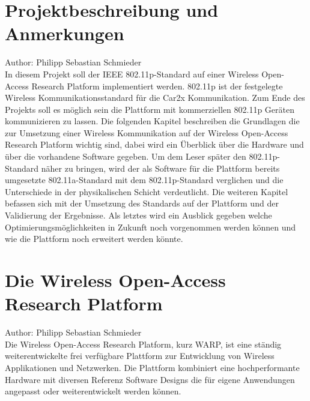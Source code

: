 \documentclass[letterpaper,11pt]{article}
\begin{document}
\thispagestyle{empty}
\newpage
\tableofcontents
\thispagestyle{empty}
\newpage
\setcounter{page}{1}
\begin{onehalfspace}
\section{Projektbeschreibung und Anmerkungen}
\small Author: Philipp Sebastian Schmieder\\
\Large
In diesem Projekt soll der IEEE 802.11p-Standard auf einer Wireless Open-Access Research Platform implementiert werden. 802.11p ist der festgelegte Wireless Kommunikationsstandard für die Car2x Kommunikation. Zum Ende des Projekts soll es möglich sein die Plattform mit kommerziellen 802.11p Geräten kommunizieren zu lassen. Die folgenden Kapitel beschreiben die Grundlagen die zur Umsetzung einer Wireless Kommunikation auf der Wireless Open-Access Research Platform wichtig sind, dabei wird ein Überblick über die Hardware und über die vorhandene Software gegeben. Um dem Leser später den 802.11p-Standard näher zu bringen, wird der als Software für die Plattform bereits umgesetzte 802.11a-Standard mit dem 802.11p-Standard verglichen und die Unterschiede in der physikalischen Schicht verdeutlicht. Die weiteren Kapitel befassen sich mit der Umsetzung des Standards auf der Plattform und der Validierung der Ergebnisse. Als letztes wird ein Ausblick gegeben welche Optimierungsmöglichkeiten in Zukunft noch vorgenommen werden können und wie die Plattform noch erweitert werden könnte. 
\section{Die Wireless Open-Access Research Platform}
\small Author: Philipp Sebastian Schmieder\\
\Large
Die Wireless Open-Access Research Platform, kurz WARP, ist eine ständig weiterentwickelte frei verfügbare Plattform zur Entwicklung von Wireless Applikationen und Netzwerken.
Die Plattform kombiniert eine hochperformante Hardware mit diversen Referenz Software Designs die für eigene Anwendungen angepasst oder weiterentwickelt werden können.

\end{onehalfspace}
\end{document}
